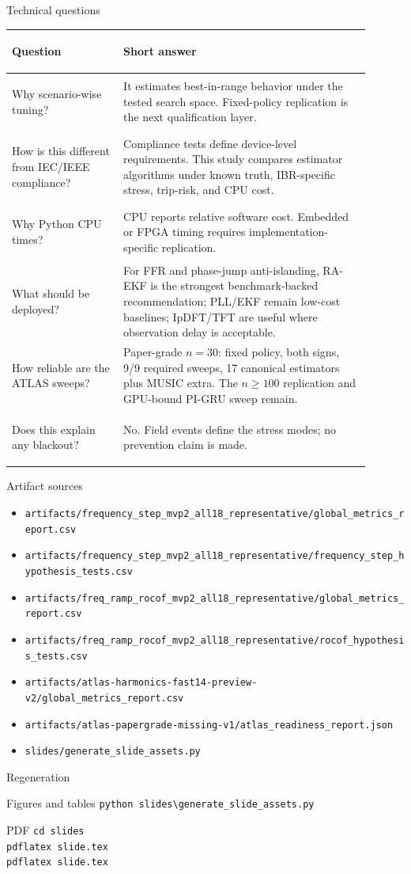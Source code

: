 \documentclass[aspectratio=169,10pt]{beamer}
\begin{document}
\begin{frame}{Technical questions}
\scriptsize
\renewcommand{\arraystretch}{1.18}
\begin{tabular}{>{\bfseries\raggedright\arraybackslash}p{0.28\linewidth}>{\raggedright\arraybackslash}p{0.62\linewidth}}
\toprule
Question & Short answer \\
\midrule
Why scenario-wise tuning? & It estimates best-in-range behavior under the tested search space. Fixed-policy replication is the next qualification layer. \\
How is this different from IEC/IEEE compliance? & Compliance tests define device-level requirements. This study compares estimator algorithms under known truth, IBR-specific stress, trip-risk, and CPU cost. \\
Why Python CPU times? & CPU reports relative software cost. Embedded or FPGA timing requires implementation-specific replication. \\
What should be deployed? & For FFR and phase-jump anti-islanding, RA-EKF is the strongest benchmark-backed recommendation; PLL/EKF remain low-cost baselines; IpDFT/TFT are useful where observation delay is acceptable. \\
How reliable are the ATLAS sweeps? & Paper-grade $n=30$: fixed policy, both signs, 9/9 required sweeps, 17 canonical estimators plus MUSIC extra. The $n\ge100$ replication and GPU-bound PI-GRU sweep remain. \\
Does this explain any blackout? & No. Field events define the stress modes; no prevention claim is made. \\
\bottomrule
\end{tabular}
\end{frame}

\begin{frame}{Artifact sources}
\scriptsize
\begin{itemize}
  \item \texttt{artifacts/frequency\_step\_mvp2\_all18\_representative/global\_metrics\_report.csv}
  \item \texttt{artifacts/frequency\_step\_mvp2\_all18\_representative/frequency\_step\_hypothesis\_tests.csv}
  \item \texttt{artifacts/freq\_ramp\_rocof\_mvp2\_all18\_representative/global\_metrics\_report.csv}
  \item \texttt{artifacts/freq\_ramp\_rocof\_mvp2\_all18\_representative/rocof\_hypothesis\_tests.csv}
  \item \texttt{artifacts/atlas-harmonics-fast14-preview-v2/global\_metrics\_report.csv}
  \item \texttt{artifacts/atlas-papergrade-missing-v1/atlas\_readiness\_report.json}
  \item \texttt{slides/generate\_slide\_assets.py}
\end{itemize}
\end{frame}

\begin{frame}{Regeneration}
\begin{block}{Figures and tables}
\texttt{python slides\textbackslash generate\_slide\_assets.py}
\end{block}
\begin{block}{PDF}
\texttt{cd slides}\\
\texttt{pdflatex slide.tex}\\
\texttt{pdflatex slide.tex}
\end{block}
\end{frame}
\fi
\end{document}
